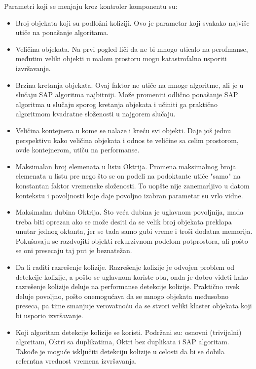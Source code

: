 \documentclass[12pt,oneside]{memoir}
\begin{document}
Parametri koji se menjaju kroz kontroler komponentu su: 
\begin{itemize}  
	\item Broj objekata koji su podložni koliziji. 
	Ovo je parametar koji svakako najviše utiče na ponašanje algoritama.
	\item Veličina objekata. 
	Na prvi pogled liči da ne bi mnogo uticalo na perofmanse, međutim veliki objekti u malom prostoru mogu katastrofalno usporiti izvršavanje.
	\item Brzina kretanja objekata.
	Ovaj faktor ne utiče na mnoge algoritme, ali je u slučaju SAP algoritma najbitniji. Može promeniti odlično ponašanje SAP algoritma u slučaju sporog kretanja 
	objekata i učiniti ga praktično algoritmom kvadratne složenosti u najgorem slučaju.
	\item Veličina kontejnera u kome se nalaze i kreću svi objekti.
	Daje još jednu perspektivu kako veličina objekata i odnos te veličine sa celim prostorom, ovde kontejnerom, utiču na performanse.
	\item Maksimalan broj elemenata u listu Oktrija.
	Promena maksimalnog broja elemenata u listu pre nego što se on podeli na podoktante utiče "samo" na konstantan faktor vremenske složenosti.
	To uopšte nije zanemarljivo u datom kontekstu i povoljnosti koje daje povoljno izabran parametar su vrlo vidne.
	\item Maksimalna dubina Oktrija. Što veća dubina je uglavnom povoljnija, mada treba biti oprezan ako se može desiti 
	da se velik broj objekata preklapa unutar jednog oktanta, jer se tada samo gubi vreme i troši dodatna memorija. 
	Pokušavaju se razdvojiti objekti rekurzivnom podelom potprostora, ali pošto se oni presecaju taj put je beznatežan.
	\item Da li raditi razrešenje kolizije. 
	Razrešenje kolizije je odvojen problem od detekcije kolizije, a pošto se uglavnom koriste oba, onda je dobro videti 
	kako razrešenje kolizije deluje na performanse detekcije kolizije. Praktično uvek deluje povoljno, pošto onemogućava da se mnogo 
	objekata međusobno preseca, pa time smanjuje verovatnoću da se stvori veliki klaster objekata koji bi usporio izvršavanje.
	\item Koji algoritam detekcije kolizije se koristi. Podržani su: osnovni (trivijalni) algoritam, Oktri sa duplikatima,
	Oktri bez duplikata i SAP algoritam. Takođe je moguće isključiti detekciju kolizije u celosti da bi se dobila referntna vrednost vremena izvršavanja.

\end{itemize}  
\end{document}
